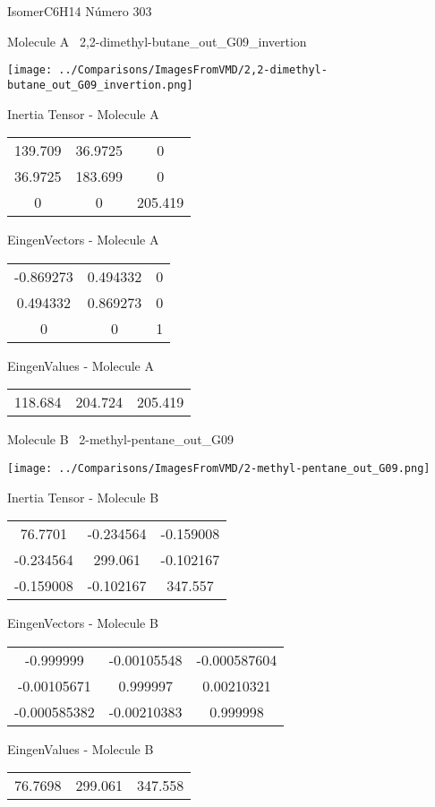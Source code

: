 \vtab[-3cm]
\begin{center}
{\large IsomerC6H14 \tab Número 303}
\end{center}
\begin{multicols}{2}
\begin{center}

Molecule A \
2,2-dimethyl-butane\_out\_G09\_invertion

\texttt{[image: ../Comparisons/ImagesFromVMD/2,2-dimethyl-butane\_out\_G09\_invertion.png]}

Inertia Tensor - Molecule A \\
\begin{tabular}{|c c c|}
139.709	 & 	36.9725	 & 	0	 \\
36.9725	 & 	183.699	 & 	0	 \\
0	 & 	0	 & 	205.419
\end{tabular}

\vtab
 EingenVectors - Molecule A     \\
\begin{tabular}{|c c c|}
-0.869273	 & 	0.494332	 & 	0	 \\
0.494332	 & 	0.869273	 & 	0	 \\
0	 & 	0	 & 	1
\end{tabular}

\vtab
 EingenValues - Molecule A     \\
\begin{tabular}{|c c c|}
118.684	 & 	204.724	 & 	205.419	 \\
\end{tabular}
\columnbreak

Molecule B \
2-methyl-pentane\_out\_G09

\texttt{[image: ../Comparisons/ImagesFromVMD/2-methyl-pentane\_out\_G09.png]}

Inertia Tensor - Molecule B \\
\begin{tabular}{|c c c|}
76.7701	 & 	-0.234564	 & 	-0.159008	 \\
-0.234564	 & 	299.061	 & 	-0.102167	 \\
-0.159008	 & 	-0.102167	 & 	347.557
\end{tabular}

\vtab
 EingenVectors - Molecule B     \\
\begin{tabular}{|c c c|}
-0.999999	 & 	-0.00105548	 & 	-0.000587604	 \\
-0.00105671	 & 	0.999997	 & 	0.00210321	 \\
-0.000585382	 & 	-0.00210383	 & 	0.999998
\end{tabular}

\vtab
 EingenValues - Molecule B     \\
\begin{tabular}{|c c c|}
76.7698	 & 	299.061	 & 	347.558	 \\
\end{tabular}

\end{center}
\end{multicols}

